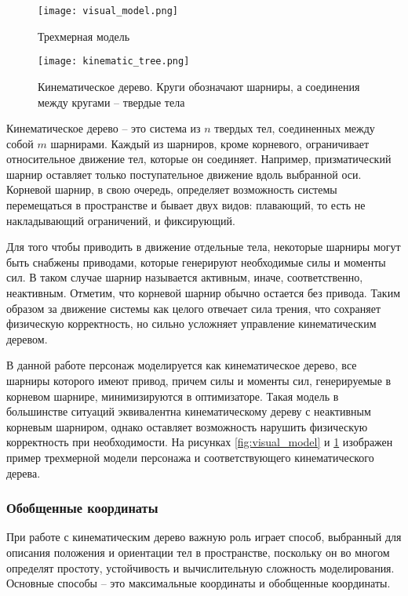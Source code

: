 \begin{figure}
  \begin{minipage}[t]{0.475\textwidth}
    \centering
    \texttt{[image: visual\_model.png]}
    \caption{Трехмерная модель}
    \label{fig:visual_model}
  \end{minipage}
\hfill
  \begin{minipage}[t]{0.475\textwidth}
    \centering
    \texttt{[image: kinematic\_tree.png]}
    \caption{Кинематическое дерево. Круги обозначают шарниры, а соединения между кругами -- твердые тела}
    \label{fig:kinematic_tree}
  \end{minipage}
\end{figure}

Кинематическое дерево -- это система из $n$ твердых тел, соединенных между собой $m$ шарнирами. Каждый из шарниров, кроме корневого, ограничивает относительное движение тел, которые он соединяет. Например, призматический шарнир оставляет только поступательное движение вдоль выбранной оси. Корневой шарнир, в свою очередь, определяет возможность системы перемещаться в пространстве и бывает двух видов: плавающий, то есть не накладывающий ограничений, и фиксирующий.

Для того чтобы приводить в движение отдельные тела, некоторые шарниры могут быть снабжены приводами, которые генерируют необходимые силы и моменты сил. В таком случае шарнир называется активным, иначе, соответственно, неактивным. Отметим, что корневой шарнир обычно остается без привода. Таким образом за движение системы как целого отвечает сила трения, что сохраняет физическую корректность, но сильно усложняет управление кинематическим деревом.

В данной работе персонаж моделируется как кинематическое дерево, все шарниры которого имеют привод, причем силы и моменты сил, генерируемые в корневом шарнире, минимизируются в оптимизаторе. Такая модель в большинстве ситуаций эквивалентна кинематическому дереву с неактивным корневым шарниром, однако оставляет возможность нарушить физическую корректность при необходимости. На рисунках \ref{fig:visual_model} и \ref{fig:kinematic_tree} изображен пример трехмерной модели персонажа и соответствующего кинематического дерева.

\subsubsection{Обобщенные координаты}

При работе с кинематическим дерево важную роль играет способ, выбранный для описания положения и ориентации тел в пространстве, поскольку он во многом определят простоту, устойчивость и вычислительную сложность моделирования. Основные способы -- это максимальные координаты и обобщенные координаты.

